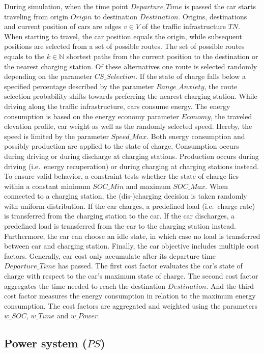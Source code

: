 During simulation, when the time point $Departure\_Time$ is passed the car starts traveling from origin $Origin$ to destination $Destination$. Origins, destinations and current position of cars are edges $v \in V$ of the traffic infrastructure $TN$. When starting to travel, the car position equals the origin, while subsequent positions are selected from a set of possible routes. The set of possible routes equals to the $k \in \mathbb{N}$ shortest paths from the current position to the destination or the nearest charging station. Of these alternatives one route is selected randomly depending on the parameter $CS\_Selection$. If the state of charge falls below a specified percentage described by the parameter $Range\_Anxiety$, the route selection probability shifts towards preferring the nearest charging station. While driving along the traffic infrastructure, cars consume energy. The energy consumption is based on the energy economy parameter $Economy$, the traveled elevation profile, car weight as well as the randomly selected speed. Hereby, the speed is limited by the parameter $Speed\_Max$. Both energy consumption and possibly production are applied to the state of charge. Consumption occurs during driving or during discharge at charging stations. Production occurs during driving (i.e.\ energy recuperation) or during charging at charging stations instead. To ensure valid behavior, a constraint tests whether the state of charge lies within a constant minimum $SOC\_Min$ and maximum $SOC\_Max$. When connected to a charging station, the (dis-)charging decision is taken randomly with uniform distribution. If the car charges, a predefined load (i.e.\ charge rate) is transferred from the charging station to the car. If the car discharges, a predefined load is transferred from the car to the charging station instead. Furthermore, the car can choose an idle state, in which case no load is transferred between car and charging station. Finally, the car objective includes multiple cost factors. Generally, car cost only accumulate after its departure time $Departure\_Time$ has passed. The first cost factor evaluates the car's state of charge with respect to the car's maximum state of charge. The second cost factor aggregates the time needed to reach the destination $Destination$. And the third cost factor measures the energy consumption in relation to the maximum energy consumption. The cost factors are aggregated and weighted using the parameters $w\_SOC$, $w\_Time$ and $w\_Power$.

\subsection{Power system ($PS$)}

